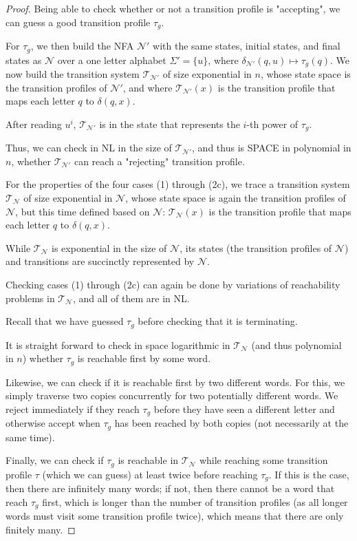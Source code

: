 \documentclass[a4paper,USenglish,cleveref,autoref,thm-restate]{lipics-v2021}
\newcommand{\mc}[1]{\ensuremath{\mathcal{#1}}}
\newcommand{\T}{\mc{T}}
\newcommand{\N}{\mc{N}}
\begin{document}
{\begin{proof}
    Being able to check whether or not a transition profile is "accepting", we can guess a good transition profile $\tau_g$.

    For $\tau_g$, we then build the NFA $\N'$ with the same states, initial states, and final states as $\N$ over a one letter alphabet $\Sigma'=\{u\}$, where $\delta_{\N'}(q,u) \mapsto \tau_g(q)$.
    We now build the transition system $\T_{\N'}$ of size exponential in $n$, whose state space is the transition profiles of $\N'$, and where $\T_{\N'}(x)$ is the transition profile that maps each letter $q$ to $\delta(q,x)$.

    After reading $u^i$, $\T_{\N'}$ is in the state that represents the $i$-th power of $\tau_g$.

    Thus, we can check in NL in the size of $\T_{\N'}$, and thus is SPACE in polynomial in $n$, whether $\T_{\N'}$ can reach a "rejecting" transition profile.

    For the properties of the four cases (1) through (2c), we
    trace a transition system $\T_{\N}$ of size exponential in $\N$, whose state space is again the transition profiles of $\N$, but this time defined based on $\N$: $\T_{\N}(x)$ is the transition profile that maps each letter $q$ to $\delta(q,x)$.

    While $\T_{\N}$ is exponential in the size of $\N$, its states (the transition profiles of $\N$) and transitions are succinctly represented by $\N$.

    Checking cases (1) through (2c) can again be done by variations of reachability problems in $\T_{\N}$, and all of them are in NL.

    Recall that we have guessed $\tau_g$ before checking that it is terminating.

    It is straight forward to check in space logarithmic in $\T_{\N}$ (and thus polynomial in $n$) whether $\tau_g$ is reachable first by some word.

    Likewise, we can check if it is reachable first by two different words. For this, we simply traverse two copies concurrently for two potentially different words. We reject immediately if they reach $\tau_g$ before they have seen a different letter and otherwise accept when $\tau_g$ has been reached by both copies (not necessarily at the same time).

    Finally, we can check if $\tau_g$ is reachable in $\T_{\N}$ while reaching some transition profile $\tau$ (which we can guess) at least twice before reaching $\tau_g$.
    If this is the case, then there are infinitely many words; if not, then there cannot be a word that reach $\tau_g$ first, which is longer than the number of transition profiles (as all longer words must visit some transition profile twice), which means that there are only finitely many.


\end{proof}}
\end{document}

